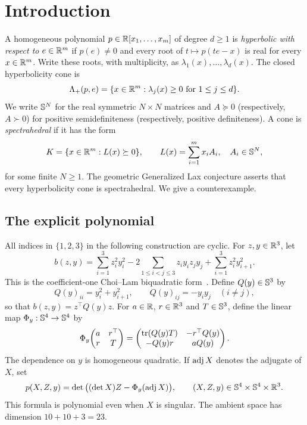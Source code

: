 \section{Introduction}
\label{sec:introduction}

A homogeneous polynomial $p\in\mathbb R[x_1,\ldots,x_m]$ of degree $d\geq1$ is
\emph{hyperbolic with respect to} $e\in\mathbb R^m$ if $p(e)\ne0$ and every root of
$t\mapsto p(te-x)$ is real for every $x\in\mathbb R^m$.
Write these roots, with multiplicity, as $\lambda_1(x),\ldots,\lambda_d(x)$.
The closed hyperbolicity cone is
\[
 \Lambda_+(p,e)=\{x\in\mathbb R^m:\lambda_j(x)\geq0\text{ for }1\leq j\leq d\}.
\]
We write $\mathbb S^N$ for the real symmetric $N\times N$ matrices and
$A\succeq0$ (respectively, $A\succ0$) for positive semidefiniteness
(respectively, positive definiteness).
A cone is \emph{spectrahedral} if it has the form
\begin{equation}
 K=\{x\in\mathbb R^m:L(x)\succeq0\},\qquad
 L(x)=\sum_{i=1}^m x_iA_i,\quad A_i\in\mathbb S^N,
 \label{eq:spectrahedral}
\end{equation}
for some finite $N\geq1$.
The geometric Generalized Lax conjecture asserts that every hyperbolicity
cone is spectrahedral. We give a counterexample.

\subsection{The explicit polynomial}

All indices in $\{1,2,3\}$ in the following construction are cyclic.
For $z,y\in\mathbb R^3$, let
\begin{equation}
 b(z,y)=\sum_{i=1}^3 z_i^2y_i^2
       -2\sum_{1\leq i<j\leq3}z_iy_iz_jy_j
       +\sum_{i=1}^3z_i^2y_{i+1}^2.
 \label{eq:form}
\end{equation}
This is the coefficient-one Choi--Lam biquadratic
form~\cite[Section~4]{choi-lam-1977}.
Define $Q(y)\in\mathbb S^3$ by
\[
 Q(y)_{ii}=y_i^2+y_{i+1}^2,\qquad
 Q(y)_{ij}=-y_iy_j\quad(i\ne j),
\]
so that $b(z,y)=z^\top Q(y)z$.
For $a\in\mathbb R$, $r\in\mathbb R^3$ and $T\in\mathbb S^3$, define the linear map
$\Phi_y:\mathbb S^4\to\mathbb S^4$ by
\begin{equation}
 \Phi_y\!\begin{pmatrix}a&r^\top\\r&T\end{pmatrix}
 =\begin{pmatrix}
    \operatorname{tr}(Q(y)T)&-r^\top Q(y)\\
    -Q(y)r&aQ(y)
   \end{pmatrix}.
 \label{eq:phi}
\end{equation}
The dependence on $y$ is homogeneous quadratic. If $\operatorname{adj} X$ denotes the
adjugate of $X$, set
\begin{equation}
 p(X,Z,y)=\det\big((\det X)Z-\Phi_y(\operatorname{adj} X)\big),
 \qquad (X,Z,y)\in\mathbb S^4\times\mathbb S^4\times\mathbb R^3.
 \label{eq:polynomial}
\end{equation}
This formula is polynomial even when $X$ is singular. The ambient space
has dimension $10+10+3=23$.

